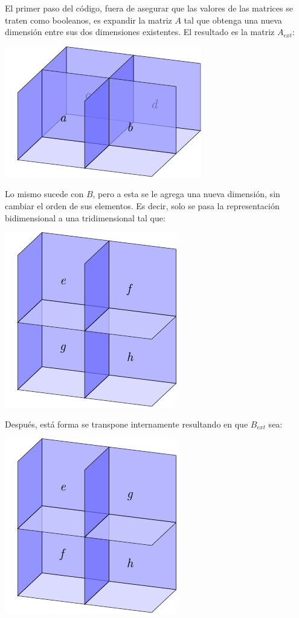 \documentclass{article}
\begin{document}
El primer paso del código, fuera de asegurar que las valores de las matrices se traten como booleanos, es expandir la matriz $A$ tal que obtenga una nueva dimensión entre sus dos dimensiones existentes. El resultado es la matriz $A_{ext}$:

\begin{center}
    \includegraphics{1.pdf}
\end{center}

Lo mismo sucede con $B$, pero a esta se le agrega una nueva dimensión, sin cambiar el orden de sus elementos. Es decir, solo se pasa la representación bidimensional a una tridimensional tal que:

\begin{center}
    \includegraphics{2.pdf}
\end{center}

Después, está forma se transpone internamente resultando en que $B_{ext}$ sea:

\begin{center}
    \includegraphics{3.pdf}
\end{center}
\end{document}
